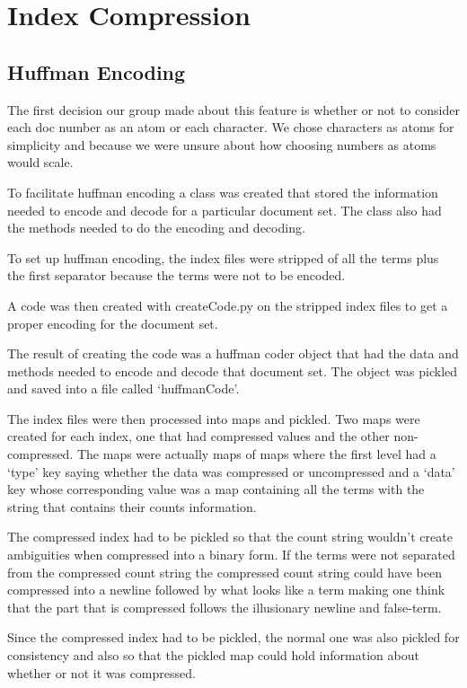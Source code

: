 \documentclass[letterpaper,11pt,twoside]{article}
\begin{document}
\section{Index Compression}

\subsection{Huffman Encoding}
The first decision our group made about this feature is whether or not to consider each doc number as an atom or each character. We chose characters as atoms for simplicity and because we were unsure about how choosing numbers as atoms would scale.

To facilitate huffman encoding a class was created that stored the information needed to encode and decode for a particular document set. The class also had the methods needed to do the encoding and decoding.

To set up huffman encoding, the index files were stripped of all the terms plus the first separator because the terms were not to be encoded.

A code was then created with createCode.py on the stripped index files to get a proper encoding for the document set.

The result of creating the code was a huffman coder object that had the data and methods needed to encode and decode that document set. The object was pickled and saved into a file called `huffmanCode'.

The index files were then processed into maps and pickled. Two maps were created for each index, one that had compressed values and the other non-compressed. The maps were actually maps of maps where the first level had a `type' key saying whether the data was compressed or uncompressed and a `data' key whose corresponding value was a map containing all the terms with the string that contains their counts information.

The compressed index had to be pickled so that the count string wouldn't create ambiguities when compressed into a binary form. If the terms were not separated from the compressed count string the compressed count string could have been compressed into a newline followed by what looks like a term making one think that the part that is compressed follows the illusionary newline and false-term.

Since the compressed index had to be pickled, the normal one was also pickled for consistency and also so that the pickled map could hold information about whether or not it was compressed.
\end{document}
